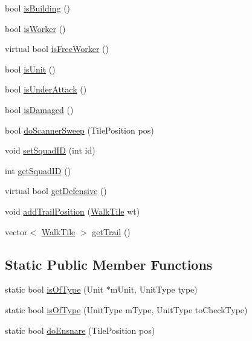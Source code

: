 \begin{DoxyCompactItemize}
bool \hyperlink{class_base_agent_a4e850b1c9ecad16d75bc9d6b61111f87}{is\-Building} ()
\item 
bool \hyperlink{class_base_agent_a4c117b1a14974aca702a7ff2494e8c5d}{is\-Worker} ()
\item 
virtual bool \hyperlink{class_base_agent_a8aa4716711f964b6a073d67b35ec97b9}{is\-Free\-Worker} ()
\item 
bool \hyperlink{class_base_agent_a8fbf66934f3cd9fc916a812daa5c31c2}{is\-Unit} ()
\item 
bool \hyperlink{class_base_agent_af93f69d8e3c920870330b9e70811a04b}{is\-Under\-Attack} ()
\item 
bool \hyperlink{class_base_agent_a746e53d8672c1851811dcc4ab899d249}{is\-Damaged} ()
\item 
bool \hyperlink{class_base_agent_ae5ad4f80bcc9a7e884a55224286cbfa2}{do\-Scanner\-Sweep} (Tile\-Position pos)
\item 
void \hyperlink{class_base_agent_aede66e43677663e01cb248e4d6e0d03b}{set\-Squad\-I\-D} (int id)
\item 
int \hyperlink{class_base_agent_ae6ae191be91ea177653e79e57ede7c8e}{get\-Squad\-I\-D} ()
\item 
virtual bool \hyperlink{class_base_agent_a23057db63ff07aec82c7fc3b94c735a4}{get\-Defensive} ()
\item 
void \hyperlink{class_base_agent_a8a2f737f4f55ef53145f100d7a9434d0}{add\-Trail\-Position} (\hyperlink{class_walk_tile}{Walk\-Tile} wt)
\item 
vector$<$ \hyperlink{class_walk_tile}{Walk\-Tile} $>$ \hyperlink{class_base_agent_a1de9312ae3f7c6f460846c37778a52d0}{get\-Trail} ()
\end{DoxyCompactItemize}
\subsection*{Static Public Member Functions}
\begin{DoxyCompactItemize}
\item 
static bool \hyperlink{class_base_agent_adb4be451cefe38cd2f53eb69a14bbb38}{is\-Of\-Type} (Unit $\ast$m\-Unit, Unit\-Type type)
\item 
static bool \hyperlink{class_base_agent_a4b87e405fc064008c981b086850dbdcb}{is\-Of\-Type} (Unit\-Type m\-Type, Unit\-Type to\-Check\-Type)
\item 
static bool \hyperlink{class_base_agent_a46b835684a3d52f928e04daef8b418de}{do\-Ensnare} (Tile\-Position pos)
\end{DoxyCompactItemize}
